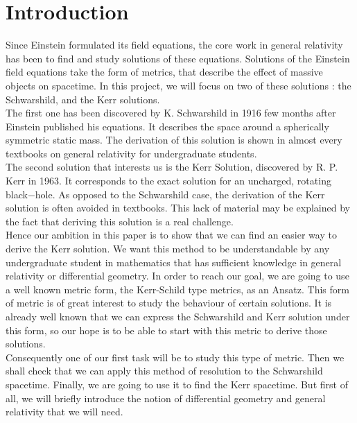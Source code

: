 \documentclass[a4paper,12pt]{article}
\theoremstyle{definition}
\begin{document}
\section{Introduction}
Since Einstein formulated its field equations, the core work in general relativity has been to find and study solutions of these equations.
Solutions of the Einstein field equations take the form of metrics, that describe the effect of massive objects on spacetime.
In this project, we will focus on two of these solutions : the Schwarshild, and the Kerr solutions.
\\The first one has been discovered by K. Schwarshild in 1916 few months after Einstein published his equations.
It describes the space around a spherically symmetric static mass.
The derivation of this solution is shown in almost every textbooks on general relativity for undergraduate students.
\\The second solution that interests us is the Kerr Solution, discovered by R. P. Kerr in 1963.
It corresponds to the exact solution for an uncharged, rotating black$-$hole.
As opposed to the Schwarshild case, the derivation of the Kerr solution is often avoided in textbooks.
This lack of material may be explained by the fact that deriving this solution is a real challenge.
\\Hence our ambition in this paper is to show that we can find an easier way to derive the Kerr solution.
We want this method to be understandable by any undergraduate student in mathematics that has sufficient knowledge in general relativity or differential geometry.
In order to reach our goal, we are going to use a well known metric form, the Kerr-Schild type metrics, as an Ansatz.
This form of metric is of great interest to study the behaviour of certain solutions.
It is already well known that we can express the Schwarshild and Kerr solution under this form, so our hope is to be able to start with this metric to derive those solutions.
\\Consequently one of our first task will be to study this type of metric.
Then we shall check that we can apply this method of resolution to the Schwarshild spacetime.
Finally, we are going to use it to find the Kerr spacetime.
But first of all, we will briefly introduce the notion of differential geometry and general relativity that we will need.



\end{document}
